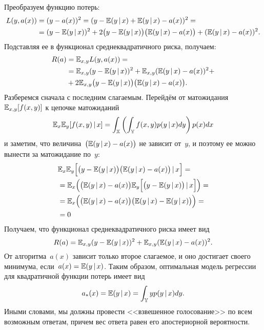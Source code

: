 \documentclass[12pt,fleqn]{article}
\begin{document}
Преобразуем функцию потерь:
\begin{align*}
    L(y, a(x))
    &=
    (y - a(x))^2
    =
    (y - \mathbb{E} (y \mspace{3mu}{|}\mspace{3mu} x) + \mathbb{E} (y \mspace{3mu}{|}\mspace{3mu} x) - a(x))^2
    =\\
    &=
    (y - \mathbb{E} (y \mspace{3mu}{|}\mspace{3mu} x))^2 +
        2 \bigl(y - \mathbb{E} (y \mspace{3mu}{|}\mspace{3mu} x)\bigr) \bigl(\mathbb{E} (y \mspace{3mu}{|}\mspace{3mu} x) - a(x)\bigr) +
        (\mathbb{E} (y \mspace{3mu}{|}\mspace{3mu} x) - a(x))^2.
\end{align*}
Подставляя ее в функционал среднеквадратичного риска, получаем:
\begin{align*}
    R(a)
    &=
    \mathbb{E}_{x, y} L(y, a(x))
    =\\
    &=
    \mathbb{E}_{x, y} (y - \mathbb{E} (y \mspace{3mu}{|}\mspace{3mu} x))^2 +
        \mathbb{E}_{x, y} (\mathbb{E} (y \mspace{3mu}{|}\mspace{3mu} x) - a(x))^2 + \\
        &+ 2 \mathbb{E}_{x, y} \bigl(y - \mathbb{E} (y \mspace{3mu}{|}\mspace{3mu} x)\bigr)
            \bigl(\mathbb{E} (y \mspace{3mu}{|}\mspace{3mu} x) - a(x)\bigr).
\end{align*}
Разберемся сначала с последним слагаемым.
Перейдём от матожидания~$\mathbb{E}_{x, y} [f(x, y)]$
к цепочке матожиданий
\[
    \mathbb{E}_{x} \mathbb{E}_{y} [f(x, y) \mspace{3mu}{|}\mspace{3mu} x]
    =
    \int_{\mathbb{X}} \left(
        \int_{\mathbb{Y}}
            f(x, y) p(y \mspace{3mu}{|}\mspace{3mu} x) dy
        \right)
        p(x) dx
\]
и заметим, что величина~$\bigl(\mathbb{E} (y \mspace{3mu}{|}\mspace{3mu} x) - a(x)\bigr)$
не зависит от~$y$, и поэтому ее можно вынести за матожидание по~$y$:
\begin{align*}
    &\mathbb{E}_{x} \mathbb{E}_y \Bigl[ \bigl(y - \mathbb{E} (y \mspace{3mu}{|}\mspace{3mu} x)\bigr)
            \bigl(\mathbb{E} (y \mspace{3mu}{|}\mspace{3mu} x) - a(x)\bigr)
            \mspace{3mu}{|}\mspace{3mu}
            x
        \Bigr]
    =\\
    &=
    \mathbb{E}_x \Bigl(
        \bigl(\mathbb{E} (y \mspace{3mu}{|}\mspace{3mu} x) - a(x)\bigr)
        \mathbb{E}_y \Bigl[
            \bigl(y - \mathbb{E} (y \mspace{3mu}{|}\mspace{3mu} x)\bigr)
            \mspace{3mu}{|}\mspace{3mu}
            x
        \Bigr]
    \Bigr)
    =\\
    &=
    \mathbb{E}_x \Bigl(
        \bigl(\mathbb{E} (y \mspace{3mu}{|}\mspace{3mu} x) - a(x)\bigr)
        \bigl(\mathbb{E} (y \mspace{3mu}{|}\mspace{3mu} x) - \mathbb{E} (y \mspace{3mu}{|}\mspace{3mu} x)\bigr)
    \Bigr)
    =\\
    &= 0
\end{align*}
Получаем, что функционал среднеквадратичного риска имеет вид
\[
    R(a)
    =
    \mathbb{E}_{x, y} (y - \mathbb{E} (y \mspace{3mu}{|}\mspace{3mu} x))^2 +
    \mathbb{E}_{x, y} (\mathbb{E} (y \mspace{3mu}{|}\mspace{3mu} x) - a(x))^2.
\]
От алгоритма~$a(x)$ зависит только второе слагаемое,
и оно достигает своего минимума, если~$a(x) = \mathbb{E} (y \mspace{3mu}{|}\mspace{3mu} x)$.
Таким образом, оптимальная модель регрессии
для квадратичной функции потерь имеет вид
\[
    a_*(x) = \mathbb{E} (y \mspace{3mu}{|}\mspace{3mu} x)
    =
    \int_{\mathbb{Y}} y p(y \mspace{3mu}{|}\mspace{3mu} x) dy.
\]
Иными словами, мы должны провести <<взвешенное голосование>>
по всем возможным ответам, причем вес ответа равен его
апостериорной вероятности.
\end{document}
